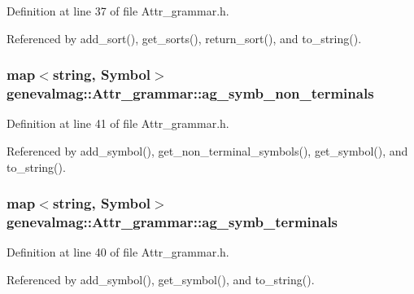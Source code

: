 Definition at line 37 of file Attr\_\-grammar.h.

Referenced by add\_\-sort(), get\_\-sorts(), return\_\-sort(), and to\_\-string().\hypertarget{classgenevalmag_1_1Attr__grammar_82631f05839109d0569a1554a35fa906}{
\subsubsection[{ag\_\-symb\_\-non\_\-terminals}]{\setlength{\rightskip}{0pt plus 5cm}map$<$string, {\bf Symbol}$>$ {\bf genevalmag::Attr\_\-grammar::ag\_\-symb\_\-non\_\-terminals}}}
\label{classgenevalmag_1_1Attr__grammar_82631f05839109d0569a1554a35fa906}




Definition at line 41 of file Attr\_\-grammar.h.

Referenced by add\_\-symbol(), get\_\-non\_\-terminal\_\-symbols(), get\_\-symbol(), and to\_\-string().\hypertarget{classgenevalmag_1_1Attr__grammar_ae56008f83f809143d7f157a7281831d}{
\subsubsection[{ag\_\-symb\_\-terminals}]{\setlength{\rightskip}{0pt plus 5cm}map$<$string, {\bf Symbol}$>$ {\bf genevalmag::Attr\_\-grammar::ag\_\-symb\_\-terminals}}}
\label{classgenevalmag_1_1Attr__grammar_ae56008f83f809143d7f157a7281831d}




Definition at line 40 of file Attr\_\-grammar.h.

Referenced by add\_\-symbol(), get\_\-symbol(), and to\_\-string().\hypertarget{classgenevalmag_1_1Attr__grammar_127f4869156cd76ee3381b19d8c7cc9a}{
\subsubsection[{count\_\-eqs}]{}}
\label{classgenevalmag_1_1Attr__grammar_127f4869156cd76ee3381b19d8c7cc9a}


